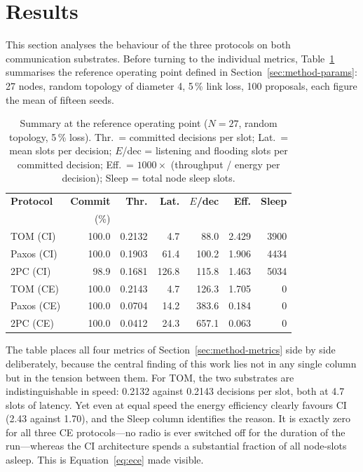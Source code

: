 \documentclass[journal]{IEEEtran}
\newcommand{\CI}{CI}                      %
\newcommand{\CE}{CE}                      %
\newcommand{\Nnodes}{N}                   %
\begin{document}
\section{Results}
\label{sec:results}
This section analyses the behaviour of the three protocols on both
communication substrates. Before turning to the individual metrics,
Table~\ref{tab:baseline} summarises the reference operating point defined
in Section~\ref{sec:method-params}: 27 nodes, random topology of diameter
4, 5\,\% link loss, 100 proposals, each figure the mean of fifteen seeds.

\begin{table}[!t]
\caption{Summary at the reference operating point ($\Nnodes = 27$, random
topology, 5\,\% loss). Thr.\ = committed decisions per slot; Lat.\ = mean
slots per decision; $E$/dec = listening and flooding slots per committed
decision; Eff.\ = $1000 \times$ (throughput / energy per decision);
Sleep = total node sleep slots.}
\label{tab:baseline}
\centering
\footnotesize
\setlength{\tabcolsep}{4pt}
\begin{tabular}{@{}lrrrrrr@{}}
\toprule
\textbf{Protocol} & \textbf{Commit} & \textbf{Thr.} & \textbf{Lat.} &
\textbf{$E$/dec} & \textbf{Eff.} & \textbf{Sleep} \\
 & (\%) & & & & & \\
\midrule
TOM (\CI)   & 100.0 & 0.2132 & 4.7   & 88.0  & 2.429 & 3900 \\
Paxos (\CI) & 100.0 & 0.1903 & 61.4  & 100.2 & 1.906 & 4434 \\
2PC (\CI)   & 98.9  & 0.1681 & 126.8 & 115.8 & 1.463 & 5034 \\
\addlinespace
TOM (\CE)   & 100.0 & 0.2143 & 4.7   & 126.3 & 1.705 & 0 \\
Paxos (\CE) & 100.0 & 0.0704 & 14.2  & 383.6 & 0.184 & 0 \\
2PC (\CE)   & 100.0 & 0.0412 & 24.3  & 657.1 & 0.063 & 0 \\
\bottomrule
\end{tabular}
\end{table}

The table places all four metrics of Section~\ref{sec:method-metrics}
side by side deliberately, because the central finding of this work lies
not in any single column but in the tension between them. For TOM, the
two substrates are indistinguishable in speed: 0.2132 against 0.2143
decisions per slot, both at 4.7 slots of latency. Yet even at equal
speed the energy efficiency clearly favours \CI{} (2.43 against 1.70),
and the Sleep column identifies the reason. It is exactly zero for all
three \CE{} protocols---no radio is ever switched off for the duration of
the run---whereas the \CI{} architecture spends a substantial fraction of
all node-slots asleep. This is Equation~\eqref{eq:ece} made visible.
\end{document}
